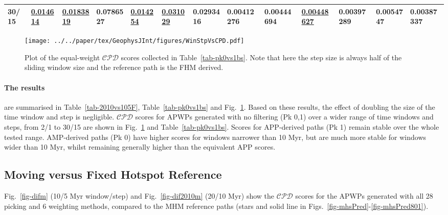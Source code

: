 \begin{landscape}
\begin{table}[]
{\begin{tabular}{@{}lllllllllllll@{}}
30/15 & {\color[HTML]{009901} {\ul\textbf{0.014614}}} & {\color[HTML]{009901} {\ul\textbf{0.0183819}}} & 0.0786527 & {\color[HTML]{009901} {\ul\textbf{0.014254}}} & {\color[HTML]{009901} {\ul\textbf{0.031029}}} & 0.0293416 & {\color[HTML]{34FF34} \textbf{0.00412276}} & 0.00444694 & {\color[HTML]{009901} {\ul\textbf{0.00448627}}} & {\color[HTML]{32CB00} \textbf{0.00397289}} & {\color[HTML]{32CB00} \textbf{0.0054747}} & {\color[HTML]{32CB00} \textbf{0.00387337}} \\ \bottomrule
\end{tabular}%
}
\end{table}
\end{landscape}

\begin{figure}[!ht]
\centering
\texttt{[image: ../../paper/tex/GeophysJInt/figures/WinStpVsCPD.pdf]}
\caption[Sliding window and step sizes vs $\mathcal{CPD}$]{Plot of the
equal-weight $\mathcal{CPD}$ scores collected in Table~\ref{tab-pk0vs1bs}. Note
that here the step size is always half of the sliding window size and the
reference path is the FHM derived.}\label{fig-WinStpVsCPD}
\end{figure}

\paragraph{The results}
are summarised in Table~\ref{tab-2010vs105F}, Table~\ref{tab-pk0vs1bs} and
Fig.~\ref{fig-WinStpVsCPD}. Based on these results, the effect of doubling the
size of the time window and step is negligible. $\mathcal{CPD}$ scores for APWPs
generated with no filtering (Pk 0,1) over a wider range of time windows and
steps, from 2/1 to 30/15 are shown in Fig.~\ref{fig-WinStpVsCPD} and
Table~\ref{tab-pk0vs1bs}. Scores for APP-derived paths (Pk 1) remain stable over
the whole tested range. AMP-derived paths (Pk 0) have higher scores for windows
narrower than 10 Myr, but are much more stable for windows wider than
10 Myr, whilst remaining generally higher than the equivalent APP
scores.


\subsection{Moving versus Fixed Hotspot Reference}

Fig.~\ref{fig-difm} (10/5 Myr window/step) and Fig.~\ref{fig-dif2010m} (20/10
Myr) show the $\mathcal{CPD}$ scores for the APWPs generated with all 28 picking
and 6 weighting methods, compared to the MHM reference paths (stars and solid
line in Figs.~\ref{fig-mhsPred}-\ref{fig-mhsPred801}).

